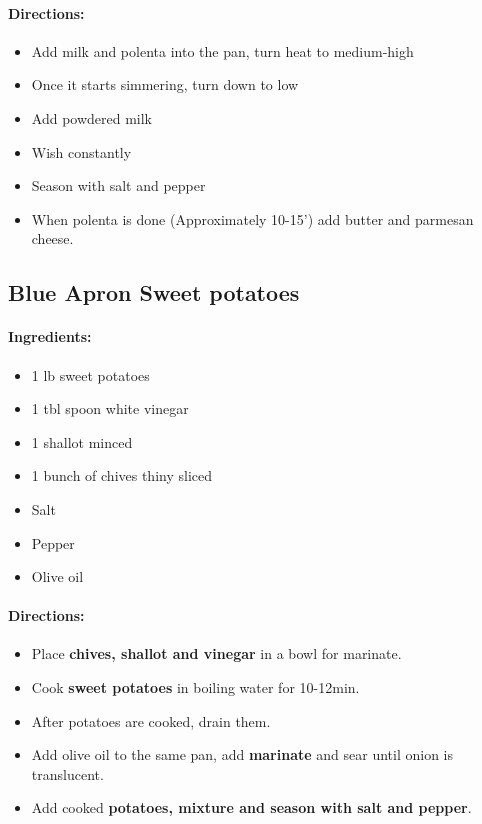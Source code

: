 \documentclass{article}
\begin{document}
\paragraph{Directions:}
\begin{itemize}
	\item Add milk and polenta into the pan, turn heat to medium-high
	\item Once it starts simmering, turn down to low
	\item Add powdered milk
	\item Wish constantly
	\item Season with salt and pepper
	\item When polenta is done (Approximately 10-15’) add butter and parmesan cheese.
\end{itemize}

\subsection{Blue Apron Sweet potatoes}

\paragraph{Ingredients:}

\begin{itemize}
	\item 1 lb sweet potatoes
	\item 1 tbl spoon white vinegar
	\item 1 shallot minced
	\item 1 bunch of chives thiny sliced
	\item Salt
	\item Pepper
	\item Olive oil
\end{itemize}

\paragraph{Directions:}
\begin{itemize}
\item Place \textbf{chives, shallot and vinegar} in a bowl for marinate.
\item Cook \textbf{sweet potatoes} in boiling water for 10-12min.
\item After potatoes are cooked, drain them.
\item Add olive oil to the same pan, add \textbf{marinate} and sear until onion is translucent.
\item Add cooked \textbf{potatoes, mixture and season with salt and pepper}.
\end{itemize}
\end{document}
